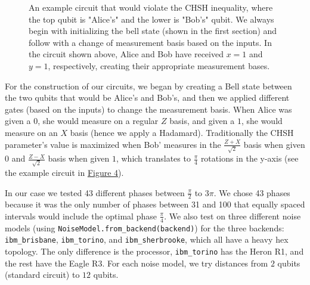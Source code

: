 \documentclass[a4paper, onecolumn, 11pt, titlepage]{quantumarticle}
\begin{document}
\begin{figure}
    \centering
    \scalebox{1.25}{
        \[
            \Qcircuit @C=1em @R=1em {
            \lstick{\left| 0 \right\rangle} & \gate{H}  & \ctrl{1} \barrier[0em]{1} & \qw & \gate{H}  \barrier[0em]{1} & \qw & \meter  \\
            \lstick{\left| 0 \right\rangle} & \qw & \targ & \qw & \gate{R_y(\phi)} & \qw  &  \qw & \meter \\
            & \cw & \cw & \cw & \cw & \cw & \cw \cwx[-2] & \cw \cwx[-1] & \cw \\
            }
        \] 
    }
    \caption{An example circuit that would violate the CHSH inequality, where the top qubit is "Alice's" and the lower is "Bob's" qubit. We always begin with initializing the bell state (shown in the first section) and follow with a change of measurement basis based on the inputs. In the circuit shown above, Alice and Bob have received $x = 1$ and $y = 1$, respectively, creating their appropriate measurement bases. }
    \label{fig:circuit-basic}
\end{figure}

For the construction of our circuits, we began by creating a Bell state between the two qubits that would be Alice's and Bob’s, and then we applied different gates (based on the inputs) to change the measurement basis. When Alice was given a $0$, she would measure on a regular $Z$ basis, and given a $1$, she would measure on an $X$ basis (hence we apply a Hadamard). Traditionally the CHSH parameter’s value is maximized when Bob’ measures in the $\frac{Z+X}{\sqrt2}$ basis when given $0$ and $\frac{Z-X}{\sqrt2}$ basis when given $1$, which translates to $\frac{\pi}{4}$ rotations in the y-axis (see the example circuit in \hyperref[fig:circuit-basic]{Figure 4}). 

In our case we tested 43 different phases between $\frac{\pi}{2}$ to $3\pi$. We chose 43 phases because it was the only number of phases between 31 and 100 that equally spaced intervals would include the optimal phase $\frac{\pi}{4}$. We also test on three different noise models (using \verb|NoiseModel.from_backend(backend)|) for the three backends: \verb|ibm_brisbane|, \verb|ibm_torino|, and \verb|ibm_sherbrooke|, which all have a heavy hex topology. The only difference is the processor, \verb|ibm_torino| has the Heron R1, and the rest have the Eagle R3. For each noise model, we try distances from $2$ qubits (standard circuit) to $12$ qubits.
\end{document}
